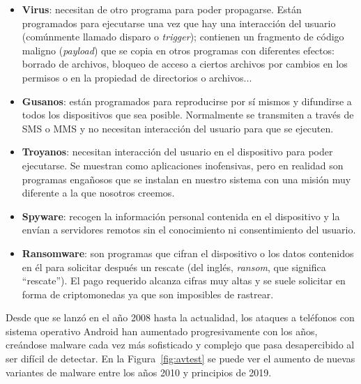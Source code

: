\begin{itemize}
	\item \textbf{Virus}: necesitan de otro programa para poder propagarse. Están programados para ejecutarse una vez que hay una interacción del usuario (comúnmente llamado disparo o \textit{trigger}); contienen un fragmento de código maligno (\textit{payload}) que se copia en otros programas con diferentes efectos: borrado de archivos, bloqueo de acceso a ciertos archivos por cambios en los permisos o en la propiedad de directorios o archivos...
	\item \textbf{Gusanos}: están programados para reproducirse por sí mismos y difundirse a todos los dispositivos que sea posible. Normalmente se transmiten a través de SMS o MMS y no necesitan interacción del usuario para que se ejecuten.
	\item \textbf{Troyanos}: necesitan interacción del usuario en el dispositivo para poder ejecutarse. Se muestran como aplicaciones inofensivas, pero en realidad son programas engañosos que se instalan en nuestro sistema con una misión muy diferente a la que nosotros creemos.
	\item \textbf{Spyware}: recogen la información personal contenida en el dispositivo y la envían a servidores remotos sin el conocimiento ni consentimiento del usuario.
	\item \textbf{Ransomware}: son programas que cifran el dispositivo o los datos contenidos en él para solicitar después un rescate (del inglés, \textit{ransom}, que significa ``rescate''). El pago requerido alcanza cifras muy altas y se suele solicitar en forma de criptomonedas ya que son imposibles de rastrear.
\end{itemize}

Desde que se lanzó en el año 2008 hasta la actualidad, los ataques a teléfonos con sistema operativo Android han aumentado progresivamente con los años, creándose malware cada vez más sofisticado y complejo que pasa desapercibido al ser difícil de detectar. En la Figura~\ref{fig:avtest} se puede ver el aumento de nuevas variantes de malware entre los años 2010 y principios de 2019.

